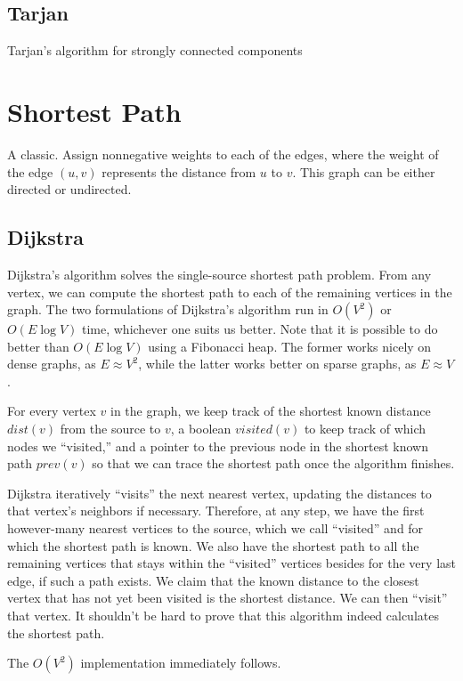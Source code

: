\subsection{Tarjan}

Tarjan's algorithm for strongly connected components

\section{Shortest Path}

A classic. Assign nonnegative weights to each of the edges, where the weight of the edge $(u,v)$ represents the distance from $u$ to $v$. This graph can be either directed or undirected.

\subsection{Dijkstra}

Dijkstra's algorithm solves the single-source shortest path problem. From any vertex, we can compute the shortest path to each of the remaining vertices in the graph. The two formulations of Dijkstra's algorithm run in $O(V^2)$ or $O(E\log{V})$ time, whichever one suits us better. Note that it is possible to do better than $O(E\log{V})$ using a Fibonacci heap. The former works nicely on dense graphs, as $E \approx V^2$, while the latter works better on sparse graphs, as $E \approx V$.

For every vertex $v$ in the graph, we keep track of the shortest known distance $dist(v)$ from the source to $v$, a boolean $visited(v)$ to keep track of which nodes we ``visited,'' and a pointer to the previous node in the shortest known path $prev(v)$ so that we can trace the shortest path once the algorithm finishes.

Dijkstra iteratively ``visits'' the next nearest vertex, updating the distances to that vertex's neighbors if necessary. Therefore, at any step, we have the first however-many nearest vertices to the source, which we call ``visited'' and for which the shortest path is known. We also have the shortest path to all the remaining vertices that stays within the ``visited'' vertices besides for the very last edge, if such a path exists. We claim that the known distance to the closest vertex that has not yet been visited is the shortest distance. We can then ``visit'' that vertex. It shouldn't be hard to prove that this algorithm indeed calculates the shortest path.

The $O(V^2)$ implementation immediately follows.

